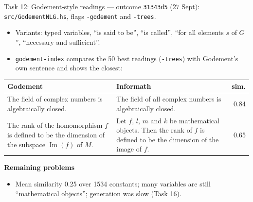 \documentclass[10pt,aspectratio=169]{beamer}
\newcommand{\commit}[1]{\texttt{\footnotesize #1}}
\begin{document}
\begin{frame}{Task 12: Godement-style readings --- outcome}
  \commit{31343d5} (27 Sept): \texttt{src/GodementNLG.hs}, flags \texttt{-godement} and \texttt{-trees}.
  \begin{itemize}\small
    \item Variants: typed variables, ``is said to be'', ``is called'',
          ``for all elements $s$ of $G$'', ``necessary and sufficient''.
    \item \texttt{godement-index} compares the 50 best readings (\texttt{-trees}) with
          Godement's own sentence and shows the closest:
  \end{itemize}
  \begin{center}\scriptsize
  \begin{tabular}{p{}p{}r}
    \toprule
    \textbf{Godement} & \textbf{Informath} & \textbf{sim.} \\
    \midrule
    The field of complex numbers is algebraically closed.
      & The field of all complex numbers is algebraically closed. & 0.84 \\
    The rank of the homomorphism $f$ is defined to be the dimension of
    the subspace $\operatorname{Im}(f)$ of $M$.
      & Let $f$, $l$, $m$ and $k$ be mathematical objects. Then the rank of $f$
        is defined to be the dimension of the image of $f$. & 0.65 \\
    \bottomrule
  \end{tabular}
  \end{center}
  \textbf{Remaining problems}
  \begin{itemize}\small
    \item Mean similarity 0.25 over 1534 constants; many variables are still
          ``mathematical objects''; generation was slow (Task 16).
  \end{itemize}
\end{frame}
\end{document}
